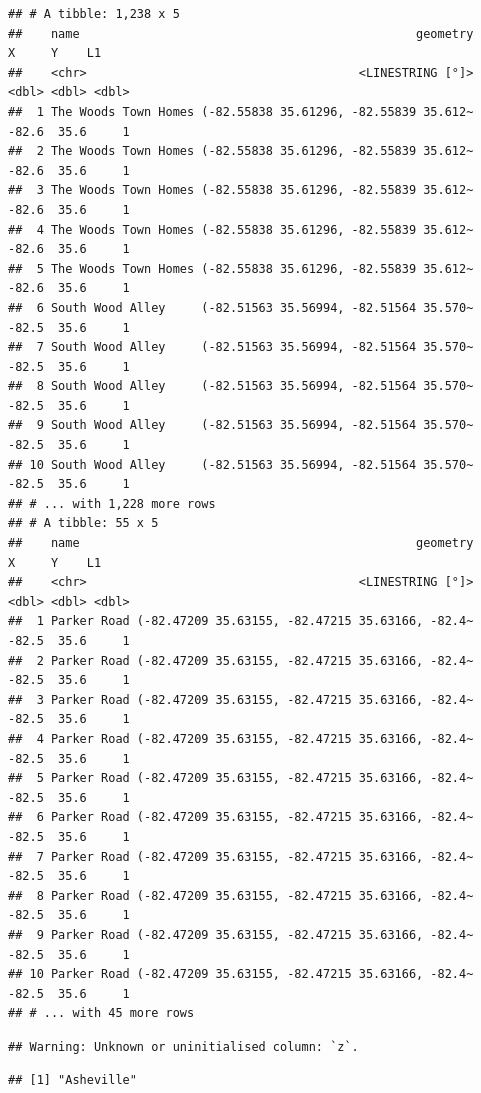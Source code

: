 \documentclass[
]{article}
\begin{document}
\begin{verbatim}
## # A tibble: 1,238 x 5
##    name                                               geometry     X     Y    L1
##    <chr>                                      <LINESTRING [°]> <dbl> <dbl> <dbl>
##  1 The Woods Town Homes (-82.55838 35.61296, -82.55839 35.612~ -82.6  35.6     1
##  2 The Woods Town Homes (-82.55838 35.61296, -82.55839 35.612~ -82.6  35.6     1
##  3 The Woods Town Homes (-82.55838 35.61296, -82.55839 35.612~ -82.6  35.6     1
##  4 The Woods Town Homes (-82.55838 35.61296, -82.55839 35.612~ -82.6  35.6     1
##  5 The Woods Town Homes (-82.55838 35.61296, -82.55839 35.612~ -82.6  35.6     1
##  6 South Wood Alley     (-82.51563 35.56994, -82.51564 35.570~ -82.5  35.6     1
##  7 South Wood Alley     (-82.51563 35.56994, -82.51564 35.570~ -82.5  35.6     1
##  8 South Wood Alley     (-82.51563 35.56994, -82.51564 35.570~ -82.5  35.6     1
##  9 South Wood Alley     (-82.51563 35.56994, -82.51564 35.570~ -82.5  35.6     1
## 10 South Wood Alley     (-82.51563 35.56994, -82.51564 35.570~ -82.5  35.6     1
## # ... with 1,228 more rows
## # A tibble: 55 x 5
##    name                                               geometry     X     Y    L1
##    <chr>                                      <LINESTRING [°]> <dbl> <dbl> <dbl>
##  1 Parker Road (-82.47209 35.63155, -82.47215 35.63166, -82.4~ -82.5  35.6     1
##  2 Parker Road (-82.47209 35.63155, -82.47215 35.63166, -82.4~ -82.5  35.6     1
##  3 Parker Road (-82.47209 35.63155, -82.47215 35.63166, -82.4~ -82.5  35.6     1
##  4 Parker Road (-82.47209 35.63155, -82.47215 35.63166, -82.4~ -82.5  35.6     1
##  5 Parker Road (-82.47209 35.63155, -82.47215 35.63166, -82.4~ -82.5  35.6     1
##  6 Parker Road (-82.47209 35.63155, -82.47215 35.63166, -82.4~ -82.5  35.6     1
##  7 Parker Road (-82.47209 35.63155, -82.47215 35.63166, -82.4~ -82.5  35.6     1
##  8 Parker Road (-82.47209 35.63155, -82.47215 35.63166, -82.4~ -82.5  35.6     1
##  9 Parker Road (-82.47209 35.63155, -82.47215 35.63166, -82.4~ -82.5  35.6     1
## 10 Parker Road (-82.47209 35.63155, -82.47215 35.63166, -82.4~ -82.5  35.6     1
## # ... with 45 more rows
\end{verbatim}

\begin{verbatim}
## Warning: Unknown or uninitialised column: `z`.
\end{verbatim}

\begin{verbatim}
## [1] "Asheville"
\end{verbatim}
\end{document}
